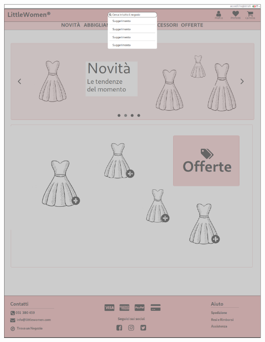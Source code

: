 \documentclass[12pt,a4paper]{report}
\begin{document}
\includegraphics[width=\textwidth]{"Project Management Sources/Wireframe/WireFrame Screenshot/Desktop/5 - Ricerca"}
\end{document}
